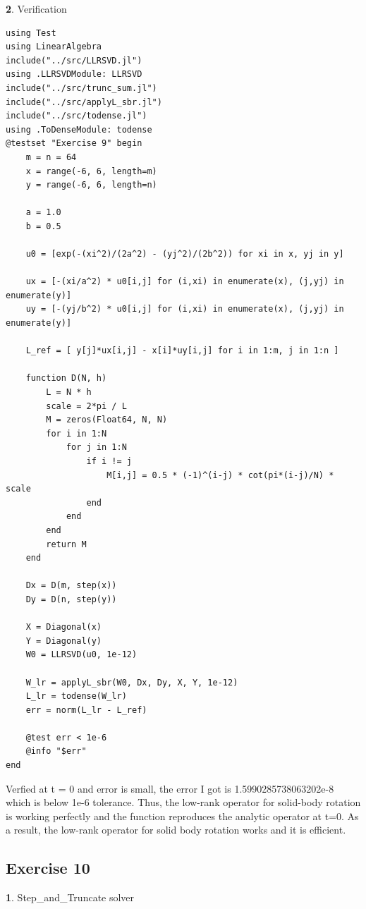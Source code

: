 \documentclass[11pt]{article}
\begin{document}
\textbf{2}. Verification

\begin{lstlisting}
using Test
using LinearAlgebra
include("../src/LLRSVD.jl")
using .LLRSVDModule: LLRSVD
include("../src/trunc_sum.jl")
include("../src/applyL_sbr.jl")
include("../src/todense.jl")
using .ToDenseModule: todense
@testset "Exercise 9" begin
    m = n = 64
    x = range(-6, 6, length=m)
    y = range(-6, 6, length=n)

    a = 1.0
    b = 0.5

    u0 = [exp(-(xi^2)/(2a^2) - (yj^2)/(2b^2)) for xi in x, yj in y]

    ux = [-(xi/a^2) * u0[i,j] for (i,xi) in enumerate(x), (j,yj) in enumerate(y)]
    uy = [-(yj/b^2) * u0[i,j] for (i,xi) in enumerate(x), (j,yj) in enumerate(y)]

    L_ref = [ y[j]*ux[i,j] - x[i]*uy[i,j] for i in 1:m, j in 1:n ]

    function D(N, h)
        L = N * h
        scale = 2*pi / L
        M = zeros(Float64, N, N)
        for i in 1:N
            for j in 1:N
                if i != j
                    M[i,j] = 0.5 * (-1)^(i-j) * cot(pi*(i-j)/N) * scale
                end
            end
        end
        return M
    end

    Dx = D(m, step(x))
    Dy = D(n, step(y))

    X = Diagonal(x)
    Y = Diagonal(y)
    W0 = LLRSVD(u0, 1e-12)

    W_lr = applyL_sbr(W0, Dx, Dy, X, Y, 1e-12)
    L_lr = todense(W_lr)
    err = norm(L_lr - L_ref)

    @test err < 1e-6
    @info "$err"
end
\end{lstlisting}
Verfied at t = 0 and error is small, the error I got is 1.5990285738063202e-8 which is below 1e-6 tolerance. Thus, the low-rank operator for solid-body rotation is working perfectly and the function reproduces the analytic operator at t=0. As a result, the low-rank operator for solid body rotation works and it is efficient.

\subsection*{Exercise 10}
\textbf{1}. Step\_and\_Truncate solver
\end{document}
